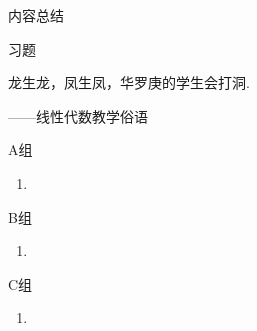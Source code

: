 \vspace{2ex}
\centerline{\heiti \Large 内容总结}

\vspace{2ex}

\centerline{\heiti \Large 习题}
\vspace{2ex}
{\kaishu 龙生龙，凤生凤，华罗庚的学生会打洞.}
\begin{flushright}
    \kaishu
    ——线性代数教学俗语
\end{flushright}
\centerline{\heiti A组}
\begin{enumerate}
    \item
\end{enumerate}
\centerline{\heiti B组}
\begin{enumerate}
    \item 
\end{enumerate}
\centerline{\heiti C组}
\begin{enumerate}
    \item
\end{enumerate}
